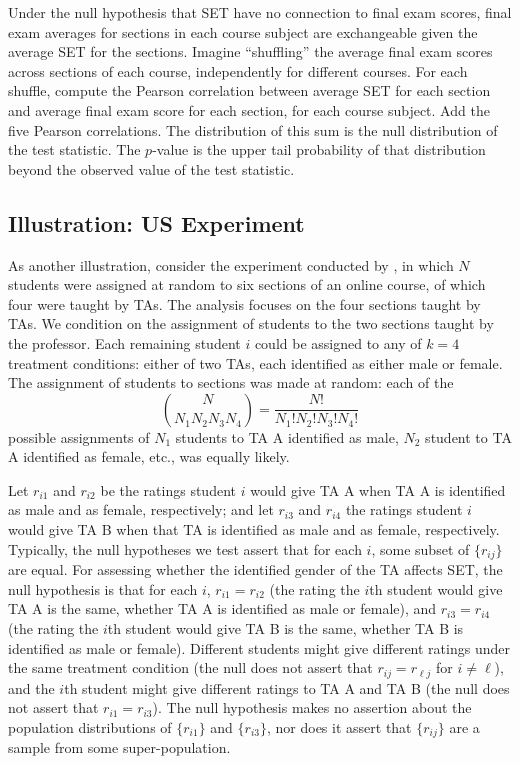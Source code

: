 \documentclass[12pt]{article}
\newcommand{\beq}{\begin{equation}}
\newcommand{\eeq}{\end{equation}}
\newcommand{\todo}[1]{{\color{red}{TO DO: \sc #1}}}
\begin{document}
Under the null hypothesis that SET have no connection to final exam scores,
final exam averages for sections in each course subject are exchangeable given the average SET
for the sections.
Imagine ``shuffling'' the average final exam scores across sections of each course, independently
for different courses.
For each shuffle, compute the Pearson correlation between average SET for each section
and average final exam score for each section, for each course subject.
Add the five Pearson correlations.
The distribution of this sum is the null distribution of the test statistic.
The $p$-value is the upper tail probability of that distribution beyond the observed value of the 
test statistic.
\todo{more here}

\subsection{Illustration: US Experiment}
As another illustration, consider the experiment conducted by \citet{MacNell2014},
in which $N$ students were assigned at random to six sections of an online course,
of which four were taught by TAs.
The analysis focuses on the four sections taught by TAs.
We condition on the assignment of students to the two sections taught by the professor.
Each remaining student $i$ could be assigned to any of $k=4$ treatment conditions:
either of two TAs, each identified as either male or female.
The assignment of students to sections was made at random: each of the
\beq
 {{N}\choose{N_1 N_2 N_3 N_4}} = \frac{N!}{N_1! N_2! N_3! N_4!}
\eeq
possible assignments of $N_1$ students to TA A identified as male,
$N_2$ student to TA A identified as female, etc., was equally likely.

Let $r_{i1}$ and $r_{i2}$ be the ratings student $i$ would give TA A when TA 
A is identified as male and as female, respectively; and let 
$r_{i3}$ and $r_{i4}$ the ratings student $i$ would give TA B when that TA
is identified as male and as female, respectively.
Typically, the null hypotheses we test assert that for each $i$, some subset of
$\{r_{ij}\}$ are  equal.
For assessing whether the identified gender of the TA affects SET,
the null hypothesis is that for each $i$,
$r_{i1} = r_{i2}$ (the rating the $i$th student would give TA A is the same,
whether TA A is identified as male or female), 
and $r_{i3} = r_{i4}$ (the rating the $i$th student would give TA B is
the same, whether TA B is identified as male or female).
Different students might give different ratings under the same treatment condition
(the null does not assert that $r_{ij} = r_{\ell j}$ for $i \ne \ell$), and
the $i$th student might 
give different ratings to TA A and TA B
(the null does not assert that $r_{i1} = r_{i3}$).
The null hypothesis makes no assertion about the population distributions of 
$\{r_{i1}\}$ and $\{r_{i3}\}$, nor does it assert that $\{r_{ij}\}$ are 
a sample from some super-population.
\end{document}
